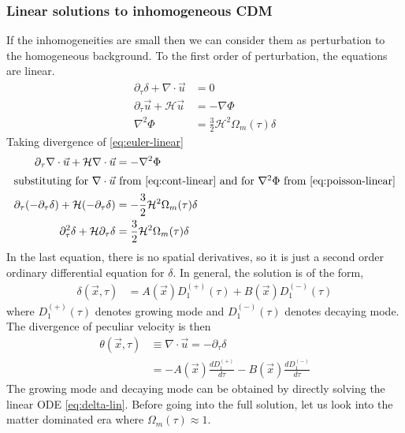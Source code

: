\documentclass[12pt]{article}
\begin{document}
\subsubsection{Linear solutions to inhomogeneous CDM}
\label{sec:linear-solution}
If the inhomogeneities are small then we can consider them as perturbation to the homogeneous background. To the first order of perturbation, the equations are linear.
\begin{align}
\label{eq:cont-linear}
\partial_{\tau} \delta + \nabla \cdot \vec{u} &= 0\\
\label{eq:euler-linear}
\partial_{\tau} \vec{u} + \mathcal{H} \vec{u} &= - \nabla \Phi\\
\label{eq:poisson-linear}
\nabla^2 \Phi &= \frac{3}{2} \mathcal{H}^2 \Omega_{m}(\tau) \delta
\end{align}
Taking divergence of \eqref{eq:euler-linear}
\begin{align}
\partial_{\tau} \nabla \cdot  \vec{u} + \mathcal{H} \nabla \cdot  \vec{u} &= - \nabla^2 \Phi \\
\intertext{substituting for $\nabla \cdot \vec{u}$ from \eqref{eq:cont-linear} and for $\nabla^2 \Phi$ from \eqref{eq:poisson-linear}}
\partial_{\tau} (-\partial_{\tau} \delta) + \mathcal{H} (-\partial_{\tau} \delta) &= - \frac{3}{2} \mathcal{H}^2 \Omega_{m}(\tau) \delta\\
\partial_{\tau}^2 \delta + \mathcal{H} \partial_{\tau} \delta &= \frac{3}{2} \mathcal{H}^2 \Omega_{m}(\tau) \delta \label{eq:delta-lin}
\end{align}
In the last equation, there is no spatial derivatives, so it is just a second order ordinary differential equation for $\delta$. In general, the solution is of the form,
\begin{align}
\delta (\vec{x}, \tau) &= A(\vec{x}) D_1^{(+)}(\tau) + B(\vec{x}) D_1^{(-)}(\tau) 
\end{align}
where $D_1^{(+)}(\tau)$ denotes growing mode and $D_1^{(-)}(\tau)$ denotes decaying mode. 
The divergence of peculiar velocity is then
\begin{align}
\theta  (\vec{x}, \tau) &\equiv \nabla \cdot  \vec{u} = -\partial_{\tau} \delta\\
&= - A(\vec{x}) \frac{d D_1^{(+)}}{d \tau} - B(\vec{x}) \frac{d D_1^{(-)}}{d \tau} 
\end{align}
The growing mode and decaying mode can be obtained by directly solving the linear ODE \eqref{eq:delta-lin}. Before going into the full solution, let us look into the matter dominated era where $\Omega_{m}(\tau) \approx 1$. 
\end{document}
